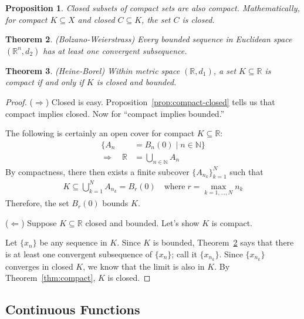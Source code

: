 \documentclass[12pt]{book}
\numberwithin{equation}{section} %
\theoremstyle{plain}
\newtheorem{thm}{Theorem}[section]
\newtheorem{prop}[thm]{Proposition}
\theoremstyle{definition}
\theoremstyle{remark}
\newcommand{\R}{\mathbb{R}}
\begin{document}
\begin{prop}
Closed subsets of compact sets are also compact. Mathematically, for
compact $K\subseteq X$ and closed $C \subseteq K$, the set $C$ is
closed.
\end{prop}

\begin{thm}{\emph{(Bolzano-Weierstrass)}}
\label{thm:bolzano-weierstrass}
Every bounded sequence in Euclidean space $(\R^n,d_2)$ has at
least one convergent subsequence.
\end{thm}

\begin{thm}{\emph{(Heine-Borel)}}
\label{thm:heine-borel}
Within metric space $(\R,d_1)$, a set $K\subseteq \R$ is
compact if and only if $K$ is closed and bounded.
\end{thm}
\begin{proof}
($\Rightarrow$)
Closed is easy. Proposition~\ref{prop:compact-closed} tells us that
compact implies closed. Now for ``compact implies bounded.''

The following is certainly an open cover for compact
$K\subseteq \R$:
\begin{align*}
  \{ A_n &= B_n(0) \; | \; n \in \mathbb{N}\}\\
  \Rightarrow\quad
   \R &= \bigcup_{n\in \mathbb{N}} A_n
\end{align*}
By compactness, there then exists a finite subcover
$\{A_{n_k}\}_{k=1}^N$ such that
\begin{align*}
  K \subseteq \bigcup_{k=1}^N A_{n_k}
  = B_r(0)
  \quad \text{where} \;r=\max_{k=1,\ldots,N} n_k
\end{align*}
Therefore, the set $B_r(0)$ bounds $K$.

($\Leftarrow$) Suppose $K\subseteq \R$ closed and bounded. Let's
show $K$ is compact.

Let $\{x_n\}$ be any sequence in $K$. Since $K$ is bounded,
Theorem~\ref{thm:bolzano-weierstrass} says that there is at least one
convergent subsequence of $\{x_n\}$; call it $\{x_{n_k}\}$.  Since
$\{x_{n_k}\}$ converges in closed $K$, we know that the limit is also in
$K$. By Theorem~\ref{thm:compact}, $K$ is closed.
\end{proof}



\clearpage
\subsection{Continuous Functions}
\end{document}
